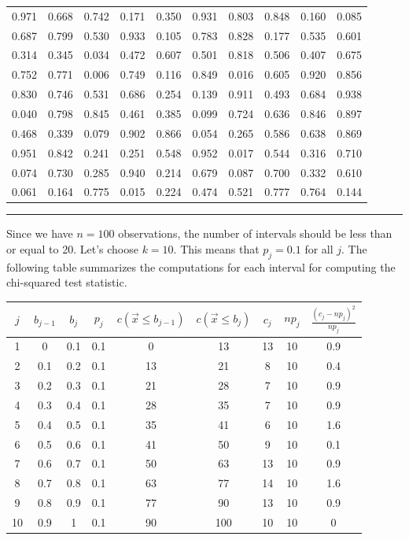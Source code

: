 \documentclass[
]{book}
\theoremstyle{definition}
\theoremstyle{definition}
\theoremstyle{definition}
\theoremstyle{definition}
\theoremstyle{remark}
\begin{document}
\begin{longtable}[]{@{}cccccccccc@{}}
\toprule
\endhead
0.971 & 0.668 & 0.742 & 0.171 & 0.350 & 0.931 & 0.803 & 0.848 & 0.160 & 0.085 \\
0.687 & 0.799 & 0.530 & 0.933 & 0.105 & 0.783 & 0.828 & 0.177 & 0.535 & 0.601 \\
0.314 & 0.345 & 0.034 & 0.472 & 0.607 & 0.501 & 0.818 & 0.506 & 0.407 & 0.675 \\
0.752 & 0.771 & 0.006 & 0.749 & 0.116 & 0.849 & 0.016 & 0.605 & 0.920 & 0.856 \\
0.830 & 0.746 & 0.531 & 0.686 & 0.254 & 0.139 & 0.911 & 0.493 & 0.684 & 0.938 \\
0.040 & 0.798 & 0.845 & 0.461 & 0.385 & 0.099 & 0.724 & 0.636 & 0.846 & 0.897 \\
0.468 & 0.339 & 0.079 & 0.902 & 0.866 & 0.054 & 0.265 & 0.586 & 0.638 & 0.869 \\
0.951 & 0.842 & 0.241 & 0.251 & 0.548 & 0.952 & 0.017 & 0.544 & 0.316 & 0.710 \\
0.074 & 0.730 & 0.285 & 0.940 & 0.214 & 0.679 & 0.087 & 0.700 & 0.332 & 0.610 \\
0.061 & 0.164 & 0.775 & 0.015 & 0.224 & 0.474 & 0.521 & 0.777 & 0.764 & 0.144 \\
\bottomrule
\end{longtable}

\begin{center}\rule{0.5\linewidth}{0.5pt}\end{center}

Since we have \(n = 100\) observations, the number of intervals should be less than or
equal to 20. Let's choose \(k=10\). This means that \(p_{j} = 0.1\) for all
\(j\). The following table summarizes the computations for each interval for computing the chi-squared test statistic.

\begin{longtable}[]{@{}ccccccccc@{}}
\toprule
\(j\) & \(b_{j-1}\) & \(b_{j}\) & \(p_j\) & \(c(\vec{x} \leq b_{j-1})\) & \(c(\vec{x} \leq b_{j})\) & \(c_{j}\) & \(np_{j}\) & \(\frac{\left( c_{j} - np_{j} \right)^{2}}{np_{j}}\) \\
\midrule
\endhead
1 & 0 & 0.1 & 0.1 & 0 & 13 & 13 & 10 & 0.9 \\
2 & 0.1 & 0.2 & 0.1 & 13 & 21 & 8 & 10 & 0.4 \\
3 & 0.2 & 0.3 & 0.1 & 21 & 28 & 7 & 10 & 0.9 \\
4 & 0.3 & 0.4 & 0.1 & 28 & 35 & 7 & 10 & 0.9 \\
5 & 0.4 & 0.5 & 0.1 & 35 & 41 & 6 & 10 & 1.6 \\
6 & 0.5 & 0.6 & 0.1 & 41 & 50 & 9 & 10 & 0.1 \\
7 & 0.6 & 0.7 & 0.1 & 50 & 63 & 13 & 10 & 0.9 \\
8 & 0.7 & 0.8 & 0.1 & 63 & 77 & 14 & 10 & 1.6 \\
9 & 0.8 & 0.9 & 0.1 & 77 & 90 & 13 & 10 & 0.9 \\
10 & 0.9 & 1 & 0.1 & 90 & 100 & 10 & 10 & 0 \\
\bottomrule
\end{longtable}
\end{document}
